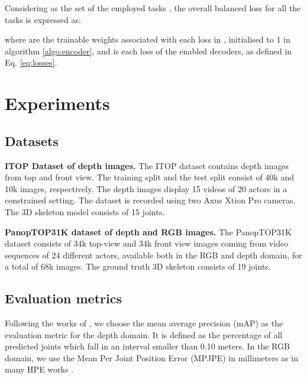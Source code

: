\documentclass[10pt,twocolumn,letterpaper]{article}
\begin{document}
Considering  as the set of the employed tasks , the overall balanced loss for all the tasks is expressed as:





where  are the trainable weights associated with each loss in , initialised to 1 in algorithm \ref{algo:encoder}, and  is each loss of the enabled decoders, as defined in Eq. \ref{eq:losses}. 


\section{Experiments}
\label{sec:experiments}

\subsection{Datasets}

\textbf{ITOP Dataset of depth images.} The ITOP dataset \cite{haque2016towards} contains depth images from top and front view. The training split and the test split consist of 40k and 10k images, respectively. The depth images display 15 videos of 20 actors in a constrained setting. The dataset is recorded using two Axus Xtion Pro cameras. The 3D skeleton model consists of 15 joints.

\textbf{PanopTOP31K dataset of depth and RGB images.} The PanopTOP31K dataset \cite{garau2021panoptop} consists of 34k top-view and 34k front view images coming from video sequences of 24 different actors, available both in the RGB and depth domain, for a total of 68k images. The ground truth 3D skeleton consists of 19 joints.

\subsection{Evaluation metrics}

Following the works of \cite{haque2016towards,moon2018v2v,xiong2019a2j}, we choose the mean average precision (mAP) as the evaluation metric for the depth domain. It is defined as the percentage of all predicted joints which fall in an interval smaller than 0.10 meters. In the RGB domain, we use the Mean Per Joint Position Error (MPJPE) in millimeters as in many HPE works \cite{cao2017realtime,tome2017lifting,ramirez2020bayesian}.
\end{document}
